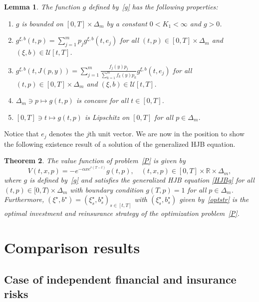 \documentclass[reqno, 11pt]{amsart}%
\newcommand{\R}{\mathbb{R}}
\newtheorem{theorem}{Theorem}
\newtheorem{lemma}[theorem]{Lemma}
\theoremstyle{definition}
\numberwithin{equation}{section} \numberwithin{theorem}{section}
\begin{document}
\begin{lemma}\label{propg}
	The function $g$ defined by~\eqref{g} has the following properties:
	\begin{enumerate}
		\item $g$ is bounded on $[0,T]\times\Delta_m$ by a constant $0<K_1<\infty$ and $g>0$.
		\item $g^{\xi,b}(t,p) = \sum_{j=1}^m p_j g^{\xi,b}(t,e_j)$ for all $(t,p)\in[0,T]\times\Delta_m$ and $(\xi,b)\in{\mathcal U}[t,T]$.
      \item $g^{\xi,b}(t,J(p,y)) = \sum_{j=1}^m \frac{f_j(y)p_j}{\sum_{k=1}^m f_k(y)p_k} g^{\xi,b}(t,e_j)$ for all $(t,p)\in[0,T]\times\Delta_m$ and $(\xi,b)\in{\mathcal U}[t,T]$.
		\item $\Delta_m\ni p\mapsto g(t,p)$ is concave for all $t\in[0,T]$.
		\item $[0,T]\ni t\mapsto g(t,p)$ is Lipschitz on $[0,T]$ for all $p\in\Delta_m$.
	\end{enumerate}
\end{lemma}

Notice that $e_j$ denotes the $j$th unit vector. We are now in the position to show the following existence result of a solution of the generalized HJB equation.

\begin{theorem}\label{existenceHJB}
	The value function of  problem~\eqref{P} is given by
	\begin{equation*}
	V(t,x,p) = -e^{-\alpha x e^{r(T-t)}}g(t,p),\quad (t,x,p)\in[0,T]\times\R\times\Delta_m,
	\end{equation*}
	where $g$ is defined by~\eqref{g} and satisfies the generalized HJB equation \eqref{HJBg} for all $(t,p)\in[0,T)\times\Delta_m$ with boundary condition $g(T,p)=1$ for all $p\in\Delta_m$. 
	Furthermore, $(\xi^\star,b^\star)=(\xi^\star_s,b^\star_s)_{s\in[t,T]}$ with $(\xi^\star_s,b^\star_s)$ given by~\eqref{optstr} is the optimal investment and reinsurance strategy of the optimization problem~\eqref{P}. 
\end{theorem}


\section{Comparison results}\label{sec:comp}

\subsection{Case of independent financial and insurance risks}
\end{document}
